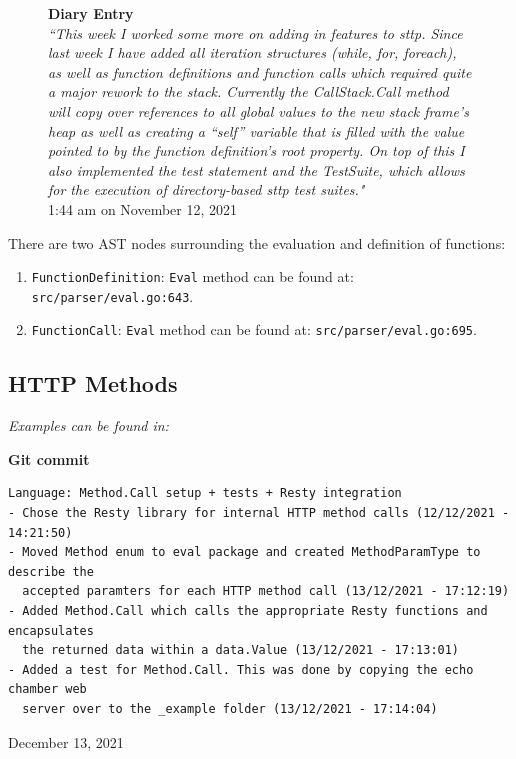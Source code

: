 \documentclass[]{full}
\theoremstyle{definition}
\begin{document}
\begin{figure}[H]
    \begin{center}
        \textbf{Diary Entry}\\[0.5em]
        \textit{``This week I worked some more on adding in features to sttp. Since last week I have added all iteration structures (while, for, foreach), as well as function definitions and function calls which required quite a major rework to the stack. Currently the CallStack.Call method will copy over references to all global values to the new stack frame’s heap as well as creating a “self” variable that is filled with the value pointed to by the function definition’s root property. On top of this I also implemented the test statement and the TestSuite, which allows for the execution of directory-based sttp test suites."}\\[0.5em]
        \tiny{1:44 am on November 12, 2021}
    \end{center}
\end{figure}

There are two AST nodes surrounding the evaluation and definition of functions:

\begin{enumerate}
    \item \verb|FunctionDefinition|: \verb|Eval| method can be found at: \verb|src/parser/eval.go:643|.
    \item \verb|FunctionCall|: \verb|Eval| method can be found at: \verb|src/parser/eval.go:695|.
\end{enumerate}

\subsection{HTTP Methods}

\textit{Examples can be found in: }

\begin{center}
    \textbf{Git commit}
    \begin{verbatim}
Language: Method.Call setup + tests + Resty integration
- Chose the Resty library for internal HTTP method calls (12/12/2021 - 14:21:50)
- Moved Method enum to eval package and created MethodParamType to describe the
  accepted paramters for each HTTP method call (13/12/2021 - 17:12:19)
- Added Method.Call which calls the appropriate Resty functions and encapsulates
  the returned data within a data.Value (13/12/2021 - 17:13:01)
- Added a test for Method.Call. This was done by copying the echo chamber web
  server over to the _example folder (13/12/2021 - 17:14:04)
    \end{verbatim}
    \vspace{-1em}
    \tiny{December 13, 2021}
\end{center}
\end{document}
